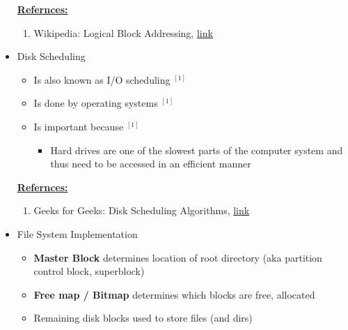 \documentclass[12pt]{article}
\begin{document}
\begin{itemize}
    \bigskip

    \underline{\textbf{Refernces:}}

    \bigskip

    \begin{enumerate}[1)]
        \item Wikipedia: Logical Block Addressing, \href{https://en.wikipedia.org/wiki/Logical_block_addressing}{link}
    \end{enumerate}

    \item Disk Scheduling
    \begin{itemize}
        \item Is also known as I/O scheduling $^{[1]}$
        \item Is done by operating systems $^{[1]}$
        \item Is important because $^{[1]}$
        \begin{itemize}
            \item Hard drives are one of the slowest parts of the computer system
            and thus need to be accessed in an efficient manner
        \end{itemize}
    \end{itemize}

    \bigskip

    \underline{\textbf{Refernces:}}

    \bigskip

    \begin{enumerate}[1)]
        \item Geeks for Geeks: Disk Scheduling Algorithms, \href{https://www.geeksforgeeks.org/disk-scheduling-algorithms/}{link}
    \end{enumerate}
    \item File System Implementation
    \begin{itemize}
        \item \textbf{Master Block} determines location of root directory
        (aka partition control block, superblock)
        \item \textbf{Free map / Bitmap} determines which blocks are free, allocated
        \item Remaining disk blocks used to store files (and dirs)


\end{itemize}
\end{itemize}
\end{document}
